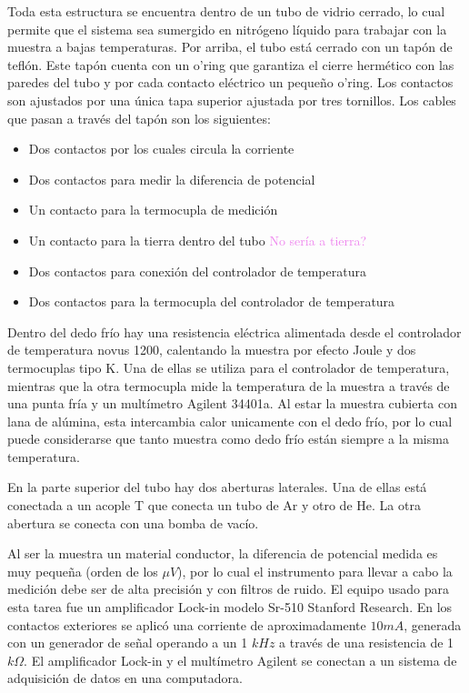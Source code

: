 \documentclass[12pt]{article}
\theoremstyle{definition}
\theoremstyle{remark}
\begin{document}
{Toda esta estructura se encuentra dentro de un tubo de vidrio cerrado, lo cual permite que el sistema sea sumergido en nitrógeno líquido para trabajar con la muestra a bajas temperaturas. Por arriba, el tubo está cerrado con un tapón de teflón. Este tapón cuenta con un o'ring que garantiza el cierre hermético con las paredes del tubo y por cada contacto eléctrico un pequeño o'ring. Los contactos son ajustados por una única tapa superior ajustada por tres tornillos. Los cables que pasan a través del tapón son los siguientes:
\begin{itemize}
\item Dos contactos por los cuales circula la corriente 
\item Dos contactos para medir la diferencia de potencial
\item Un contacto para la termocupla de medición
\item Un contacto para la tierra dentro del tubo \textcolor{violet}{No sería a tierra?}
\item Dos contactos para conexión del controlador de temperatura
\item Dos contactos para la termocupla del controlador de temperatura
\end{itemize}


Dentro del dedo frío hay una resistencia eléctrica alimentada desde el controlador de temperatura novus 1200, calentando la muestra por efecto Joule y dos termocuplas tipo K. Una de ellas se utiliza para el controlador de temperatura, mientras que la otra termocupla mide la temperatura de la muestra a través de una punta fría y un multímetro Agilent 34401a. Al estar la muestra cubierta con lana de alúmina, esta intercambia calor unicamente con el dedo frío, por lo cual puede considerarse que tanto muestra como dedo frío están siempre a la misma temperatura.

En la parte superior del tubo hay dos aberturas laterales. Una de ellas está conectada a un acople T que conecta un tubo de Ar y otro de He. La otra abertura se conecta con una bomba de vacío.

Al ser la muestra un material conductor, la diferencia de potencial medida es muy pequeña (orden de los $\mu V$), por lo cual el instrumento para llevar a cabo la medición debe ser de alta precisión y con filtros de ruido. El equipo usado para esta tarea fue un amplificador Lock-in modelo Sr-510 Stanford Research. En los contactos exteriores se aplicó una corriente de aproximadamente $10mA$, generada con un generador de señal operando a un 1 $kHz$ a través de una resistencia de 1$k\Omega$. El amplificador Lock-in y el multímetro Agilent se conectan a un sistema de adquisición de datos en una computadora. 

}
\end{document}
